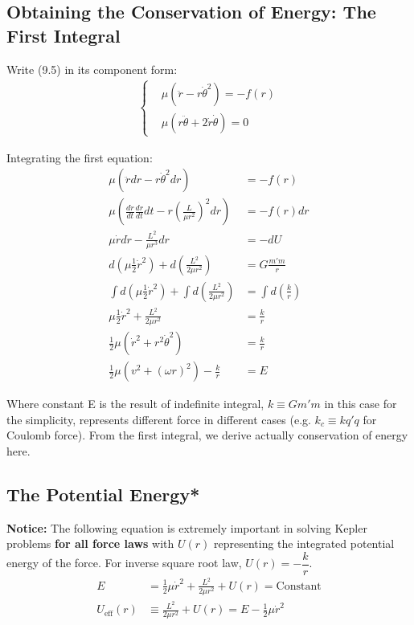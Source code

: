 \documentclass[11pt, a4paper, oneside]{book}
\numberwithin{equation}{section}%
\begin{document}
\subsection{Obtaining the Conservation of Energy: The First Integral}
	Write (9.5) in its component form:
	\begin{align}
	\left\{
		\begin{aligned}
		&\mu(\ddot{r} - r \dot{\theta}^2) = -f(r)\\
		&\mu(r \ddot{\theta} + 2\dot{r}\dot{\theta}) = 0
		\end{aligned}
	\right.
	\end{align}
	
	Integrating the first equation:
	\begin{align}
	\mu(\ddot{r}dr - r \dot{\theta}^2dr) &= -f(r)\\
	\mu \left( \frac{d\dot{r}}{dt} \frac{dr}{dt} dt - r\left(\frac{L}{\mu r^2}\right)^2dr \right)&= -f(r)dr\\
	\mu\dot{r}d\dot{r} - \frac{L^2}{\mu r^3}dr&= -dU\\
	d(\mu\frac{1}{2}\dot{r}^2) + d\left(\frac{L^2}{2\mu r^2}\right)&= G\frac{m'm}{r}\\
	\int d(\mu\frac{1}{2}\dot{r}^2) + \int d\left(\frac{L^2}{2\mu r^2}\right)&= \int d\left(\frac{k}{r}\right)\\
	\mu\frac{1}{2}\dot{r}^2 + \frac{L^2}{2\mu r^2} &= \frac{k}{r}\\
	\frac{1}{2}\mu(\dot{r}^2 + r^2\dot{\theta}^2) &= \frac{k}{r}\\
	\frac{1}{2}\mu(v^2 + (\omega r)^2) - \frac{k}{r} &= E
	\end{align}
	
	Where constant E is the result of indefinite integral, $k \equiv Gm'm$ in this case for the simplicity, represents different force in different cases (e.g. $k_c \equiv kq'q$ for Coulomb force). From the first integral, we derive actually conservation of energy here.

\subsection{The Potential Energy*}
\textbf{Notice:} The following equation is extremely important in solving Kepler problems \textbf{for all force laws} with $U(r)$ representing the integrated potential energy of the force. For inverse square root law, $U(r)=-\dfrac{k}{r}$.
\begin{align}
E &= \frac{1}{2}\mu\dot{r}^2 + \frac{L^2}{2\mu r^2} + U(r) = \text{Constant}\\
U_{\text{eff}}(r) &\equiv \frac{L^2}{2\mu r^2} + U(r) = E-\frac{1}{2}\mu\dot{r}^2
\end{align}	
\end{document}
